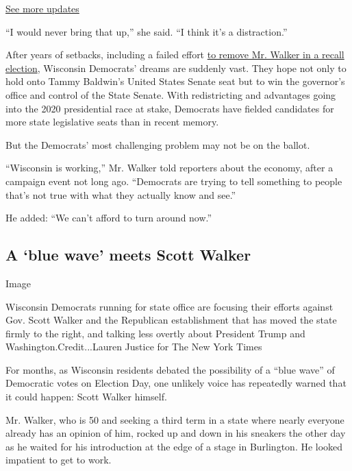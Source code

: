 \href{https://www.nytimes.com/2020/07/31/us/elections/biden-vs-trump.html?action=click\&pgtype=Article\&state=default\&region=MAIN_CONTENT_1\&context=storylines_live_updates}{See
more updates}

``I would never bring that up,'' she said. ``I think it's a
distraction.''

After years of setbacks, including a failed effort
\href{https://www.nytimes.com/2012/06/06/us/politics/walker-survives-wisconsin-recall-effort.html}{to
remove Mr. Walker in a recall election}, Wisconsin Democrats' dreams are
suddenly vast. They hope not only to hold onto Tammy Baldwin's United
States Senate seat but to win the governor's office and control of the
State Senate. With redistricting and advantages going into the 2020
presidential race at stake, Democrats have fielded candidates for more
state legislative seats than in recent memory.

But the Democrats' most challenging problem may not be on the ballot.

``Wisconsin is working,'' Mr. Walker told reporters about the economy,
after a campaign event not long ago. ``Democrats are trying to tell
something to people that's not true with what they actually know and
see.''

He added: ``We can't afford to turn around now.''

\hypertarget{a-blue-wave-meets-scott-walker}{%
\subsection{A `blue wave' meets Scott
Walker}\label{a-blue-wave-meets-scott-walker}}

Image

Wisconsin Democrats running for state office are focusing their efforts
against Gov. Scott Walker and the Republican establishment that has
moved the state firmly to the right, and talking less overtly about
President Trump and Washington.Credit...Lauren Justice for The New York
Times

For months, as Wisconsin residents debated the possibility of a ``blue
wave'' of Democratic votes on Election Day, one unlikely voice has
repeatedly warned that it could happen: Scott Walker himself.

Mr. Walker, who is 50 and seeking a third term in a state where nearly
everyone already has an opinion of him, rocked up and down in his
sneakers the other day as he waited for his introduction at the edge of
a stage in Burlington. He looked impatient to get to work.

